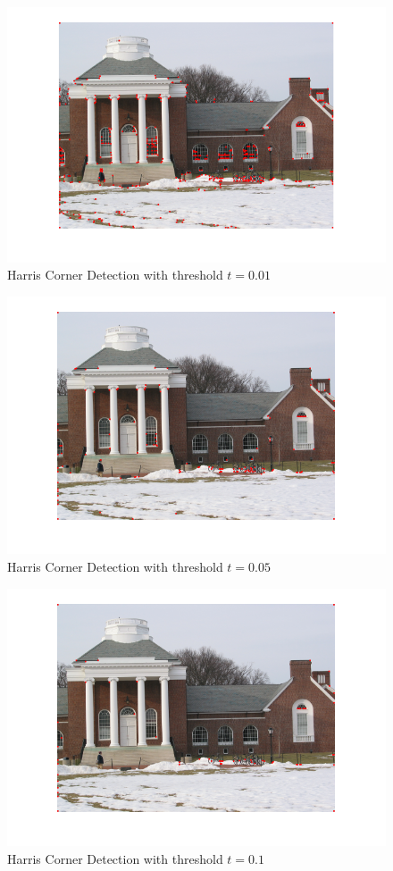 \documentclass[letterpaper]{article}
\begin{document}
\begin{figure}[H]
\centering
\includegraphics[scale=0.7]{I3t001.png}
\caption{Harris Corner Detection with threshold $t = 0.01$}
\label{rt6}
\end{figure}
\begin{figure}[H]
\centering
\includegraphics[scale=0.7]{I3t005.png}
\caption{Harris Corner Detection with threshold $t = 0.05$}
\label{rt7}
\end{figure}
\begin{figure}[H]
\centering
\includegraphics[scale=0.7]{I3t01.png}
\caption{Harris Corner Detection with threshold $t = 0.1$}
\label{rt8}
\end{figure}
\end{document}
